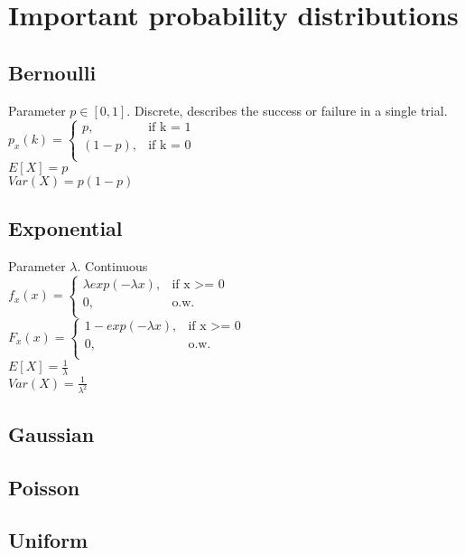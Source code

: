 \section{Important probability distributions}
\subsection*{Bernoulli}
Parameter $p \in[0,1]$. Discrete, describes the success or failure in a single trial.\\
$ p_x(k)=
	\begin{cases}
		 p,&\text{if k = 1}\\
		(1-p),&\text{if k = 0}\\
	\end{cases}
$
\\
$E[X]=p$\\
$Var(X)=p(1-p)$
\subsection*{Exponential}
Parameter $\lambda$. Continuous\\
$ f_x(x)=
	\begin{cases}
		 \lambda exp(-\lambda x),&\text{if x >= 0}\\
		0,&\text{o.w.}\\
	\end{cases}
$
\\

$ F_x(x)=
	\begin{cases}
		 1-exp(-\lambda x),&\text{if x >= 0}\\
		0,&\text{o.w.}\\
	\end{cases}
$
\\
$E[X]=\frac{1}{\lambda}$\\
$Var(X)=\frac{1}{\lambda^2}$

\subsection*{Gaussian}
\subsection*{Poisson}
\subsection*{Uniform}

